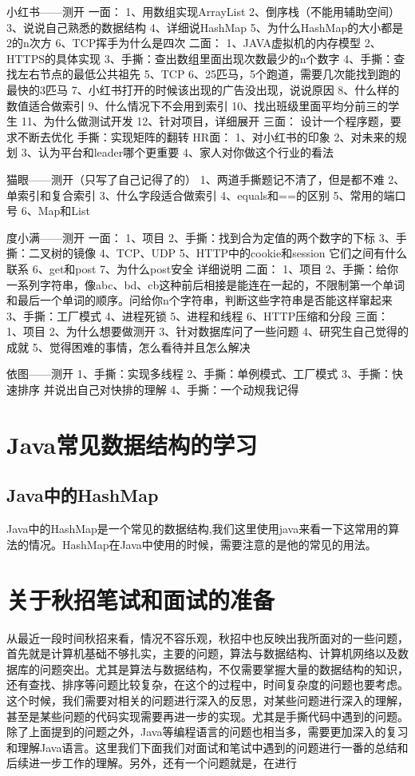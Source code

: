 \documentclass[UTF8]{ctexart}
\begin{document}
小红书——测开
一面：
1、用数组实现ArrayList
2、倒序栈（不能用辅助空间）
3、说说自己熟悉的数据结构
4、详细说HashMap
5、为什么HashMap的大小都是2的n次方
6、TCP挥手为什么是四次
二面：
1、JAVA虚拟机的内存模型
2、HTTPS的具体实现
3、手撕：查出数组里面出现次数最少的n个数字
4、手撕：查找左右节点的最低公共祖先
5、TCP
6、25匹马，5个跑道，需要几次能找到跑的最快的3匹马
7、小红书打开的时候该出现的广告没出现，说说原因
8、什么样的数值适合做索引
9、什么情况下不会用到索引
10、找出班级里面平均分前三的学生
11、为什么做测试开发
12、针对项目，详细展开
三面：
设计一个程序题，要求不断去优化
手撕：实现矩阵的翻转
HR面：
1、对小红书的印象
2、对未来的规划
3、认为平台和leader哪个更重要
4、家人对你做这个行业的看法

猫眼——测开（只写了自己记得了的）
1、两道手撕题记不清了，但是都不难
2、单索引和复合索引
3、什么字段适合做索引
4、equals和==的区别
5、常用的端口号
6、Map和List

度小满——测开
一面：
1、项目
2、手撕：找到合为定值的两个数字的下标
3、手撕：二叉树的镜像
4、TCP、UDP
5、HTTP中的cookie和session 它们之间有什么联系
6、get和post
7、为什么post安全 详细说明
二面：
1、项目
2、手撕：给你一系列字符串，像abc、bd、cb这种前后相接是能连在一起的，不限制第一个单词和最后一个单词的顺序。问给你n个字符串，判断这些字符串是否能这样窜起来
3、手撕：工厂模式
4、进程死锁
5、进程和线程
6、HTTP压缩和分段
三面：
1、项目
2、为什么想要做测开
3、针对数据库问了一些问题
4、研究生自己觉得的成就
5、觉得困难的事情，怎么看待并且怎么解决

依图——测开
1、手撕：实现多线程
2、手撕：单例模式、工厂模式
3、手撕：快速排序 并说出自己对快排的理解
4、手撕：一个动规我记得

\section{Java常见数据结构的学习}
\subsection{Java中的HashMap}
Java中的HashMap是一个常见的数据结构,我们这里使用java来看一下这常用的算法的情况。HashMap在Java中使用的时候，需要注意的是他的常见的用法。






\section{关于秋招笔试和面试的准备}
从最近一段时间秋招来看，情况不容乐观，秋招中也反映出我所面对的一些问题，首先就是计算机基础不够扎实，主要的问题，算法与数据结构、计算机网络以及数据库的问题突出。尤其是算法与数据结构，不仅需要掌握大量的数据结构的知识，还有查找、排序等问题比较复杂，在这个的过程中，时间复杂度的问题也要考虑。这个时候，我们需要对相关的问题进行深入的反思，对某些问题进行深入的理解，甚至是某些问题的代码实现需要再进一步的实现。尤其是手撕代码中遇到的问题。除了上面提到的问题之外，Java等编程语言的问题也相当多，需要更加深入的复习和理解Java语言。这里我们下面我们对面试和笔试中遇到的问题进行一番的总结和后续进一步工作的理解。另外，还有一个问题就是，在进行\\
\end{document}
